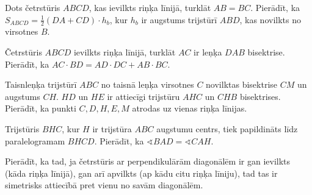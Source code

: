 \documentclass[a4paper,12pt]{article}
\begin{document}
\vspace{10pt}
\begin{problem}
Dots četrstūris $ABCD$, kas ievilkts riņķa līnijā, turklāt 
$AB = BC$. Pierādīt, ka ${\displaystyle S_{ABCD} = \frac{1}{2}(DA + CD) \cdot h_b}$, 
kur $h_b$ ir augstums trijstūrī $ABD$, kas novilkts no virsotnes $B$. 
\end{problem}

\vspace{10pt}
\begin{problem}
Četrstūris $ABCD$ ievilkts riņķa līnijā, turklāt 
$AC$ ir leņķa $DAB$ bisektrise. 
Pierādīt, ka $AC \cdot BD = AD \cdot DC + AB \cdot BC$. 
\end{problem}


\vspace{10pt}
\begin{problem}
Taisnleņķa trijstūrī $ABC$ no taisnā leņķa virsotnes $C$
novilktas bisektrise $CM$ un augstums $CH$. 
$HD$ un $HE$ ir attiecīgi trijstūru $AHC$ un $CHB$ 
bisektrises. 
Pierādīt, ka punkti $C, D, H, E, M$ atrodas
uz vienas riņķa līnijas. 
\end{problem}


\vspace{10pt}
\begin{problem}
Trijstūris $BHC$, kur $H$ ir trijstūra $ABC$ augstumu centrs, 
tiek papildināts līdz paralelogramam $BHCD$. 
Pierādīt, ka $\sphericalangle BAD = \sphericalangle CAH$. 
\end{problem}

\vspace{10pt}
\begin{problem}
Pierādīt, ka tad, ja četrstūris ar perpendikulārām 
diagonālēm ir gan ievilkts (kāda riņķa līnijā), 
gan arī apvilkts (ap kādu citu riņķa līniju), 
tad tas ir simetrisks attiecībā pret vienu no 
savām diagonālēm. 
\end{problem}
\end{document}
